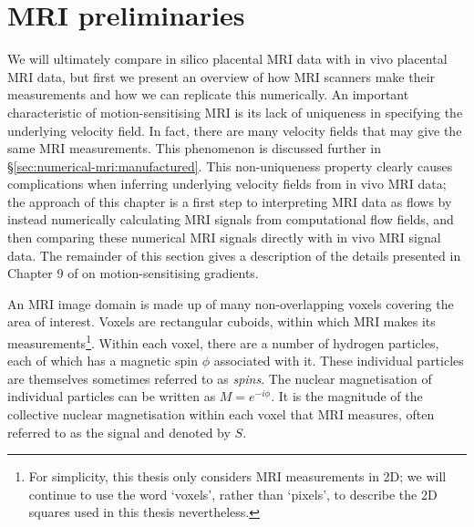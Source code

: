     \section{MRI preliminaries} \label{sec:numerical-mri:preliminaries}
        We will ultimately compare in silico placental MRI data with in vivo placental MRI data, but first we present an overview of how MRI scanners make their measurements and how we can replicate this numerically. An important characteristic of motion-sensitising MRI is its lack of uniqueness in specifying the underlying velocity field. In fact, there are many velocity fields that may give the same MRI measurements. This phenomenon is discussed further in \S\ref{sec:numerical-mri:manufactured}. This non-uniqueness property clearly causes complications when inferring underlying velocity fields from in vivo MRI data; the approach of this chapter is a first step to interpreting MRI data as flows by instead numerically calculating MRI signals from computational flow fields, and then comparing these numerical MRI signals directly with in vivo MRI signal data. The remainder of this section gives a description of the details presented in Chapter 9 of \citeauthor{bernsteinHandbookMRIPulse2004} \cite{bernsteinHandbookMRIPulse2004} on motion-sensitising gradients.
    
        An MRI image domain is made up of many non-overlapping voxels covering the area of interest. Voxels are rectangular cuboids, within which MRI makes its measurements\footnote{For simplicity, this thesis only considers MRI measurements in 2D; we will continue to use the word `voxels', rather than `pixels', to describe the 2D squares used in this thesis nevertheless.}. Within each voxel, there are a number of hydrogen particles, each of which has a magnetic spin $\phi$ associated with it. These individual particles are themselves sometimes referred to as \textit{spins}. The nuclear magnetisation of individual particles can be written as $M = e^{-i\phi}$. It is the magnitude of the collective nuclear magnetisation within each voxel that MRI measures, often referred to as the signal and denoted by $S$.
    
